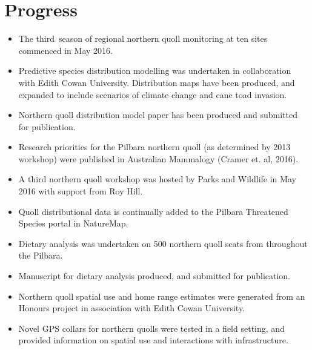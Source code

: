 \documentclass[version=last,
    paper=a4, %
    10pt, %
    usenames,
    dvipsnames,
    oneside, %
    headings=openany, %
    DIV=15 %
]{scrbook}
\begin{document}
\section*{Progress}
\begin{itemize}
\itemsep1pt\parskip0pt
\item
  The third~season of regional northern quoll monitoring at ten sites
  commenced in May 2016.
\item
  Predictive species distribution modelling was undertaken in
  collaboration with Edith Cowan University. Distribution maps have been
  produced, and expanded to include scenarios of climate change and cane
  toad invasion.
\item
  Northern quoll distribution model paper has been produced and
  submitted for publication.
\item
  Research priorities for the Pilbara northern quoll (as determined by
  2013 workshop) were published in Australian Mammalogy (Cramer et. al,
  2016).
\item
  A third northern quoll workshop was hosted by Parks and Wildlife in
  May 2016 with support from Roy Hill.
\item
  Quoll distributional data is continually added to the Pilbara
  Threatened Species portal in NatureMap.
\item
  Dietary analysis was undertaken on 500 northern quoll scats from
  throughout the Pilbara.~
\item
  Manuscript for dietary analysis produced, and submitted for
  publication.
\item
  Northern quoll spatial use and home range estimates were generated
  from an Honours project in association with Edith Cowan University.
\item
  Novel GPS collars for northern quolls were tested in a field setting,
  and provided information on spatial use and interactions with
  infrastructure.
\end{itemize}
\end{document}
